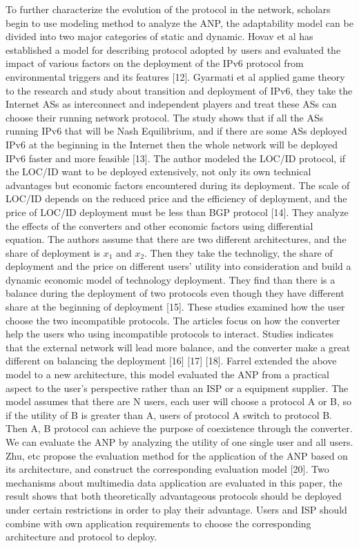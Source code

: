 \documentclass{article}
\begin{document}
To further characterize the evolution of the protocol in the network, scholars begin to use modeling method to 
analyze the ANP, the adaptability model can be divided into two major categories of static and dynamic. 
Hovav et al has established a model for describing protocol adopted by users and evaluated the impact of 
various factors on the deployment of the IPv6 protocol from environmental triggers and its features [12]. 
Gyarmati et al applied game theory to the research and study about transition and deployment of IPv6, 
they take the Internet ASs as interconnect and independent players and treat these ASs can choose their 
running network protocol. The study shows that if all the ASs running IPv6 that will be Nash Equilibrium, 
and if there are some ASs deployed IPv6 at the beginning in the Internet then the whole network will be 
deployed IPv6 faster and more feasible [13]. The author modeled the LOC/ID protocol, if the LOC/ID want 
to be deployed extensively, not only its own technical advantages but economic factors encountered during 
its deployment. The scale of LOC/ID depends on the reduced price and the efficiency of deployment, and the 
price of LOC/ID deployment must be less than BGP protocol [14]. They analyze the effects of the converters 
and other economic factors using differential equation. The authors assume that there are two different 
architectures, and the share of deployment is
\(x_{1}\) and \(x_{2}\).
Then they take the technoligy, the share of deployment and the price on different users' 
utility into consideration and build a dynamic economic model of technology deployment. They find than there is a
balance during the deployment of two protocols even though they have different share at the beginning of
deployment [15]. These studies examined how the user choose the two incompatible protocols. The articles focus
on how the converter help the users who using incompatible protocols to interact. Studies indicates that the external
network will lead more balance, and the converter make a great different on balancing the deployment [16] [17] [18].
Farrel extended the above model to a new architecture, this model evaluated the ANP from a practical aspect to the
user's perspective rather than an ISP or a equipment supplier. The model assumes that there are N users, each user
will choose a protocol A or B, so if the utility of B is greater than A, users of protocol A switch to protocol B.
Then A, B protocol can achieve the purpose of coexistence through the converter. We can evaluate the ANP by analyzing
the utility of one single user and all users. Zhu, etc propose the evaluation method for the application of the
ANP based on its architecture, and construct the corresponding evaluation model [20]. Two mechanisms about multimedia
data application are evaluated in this paper, the result shows that both theoretically advantageous protocols should
be deployed under certain restrictions in order to play their advantage. Users and ISP should combine with own
application requirements to choose the corresponding architecture and protocol to deploy.
\end{document}
